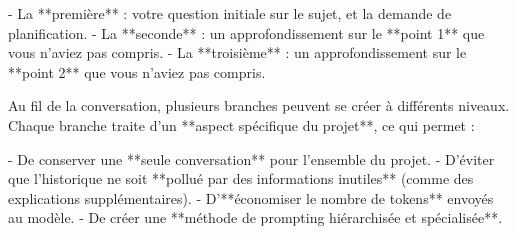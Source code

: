 - La **première** : votre question initiale sur le sujet, et la demande de planification.
- La **seconde** : un approfondissement sur le **point 1** que vous n'aviez pas compris.
- La **troisième** : un approfondissement sur le **point 2** que vous n'aviez pas compris.

Au fil de la conversation, plusieurs branches peuvent se créer à différents niveaux. Chaque branche traite d'un **aspect spécifique du projet**, ce qui permet :

- De conserver une **seule conversation** pour l'ensemble du projet.
- D'éviter que l'historique ne soit **pollué par des informations inutiles** (comme des explications supplémentaires).
- D'**économiser le nombre de tokens** envoyés au modèle.
- De créer une **méthode de prompting hiérarchisée et spécialisée**.

